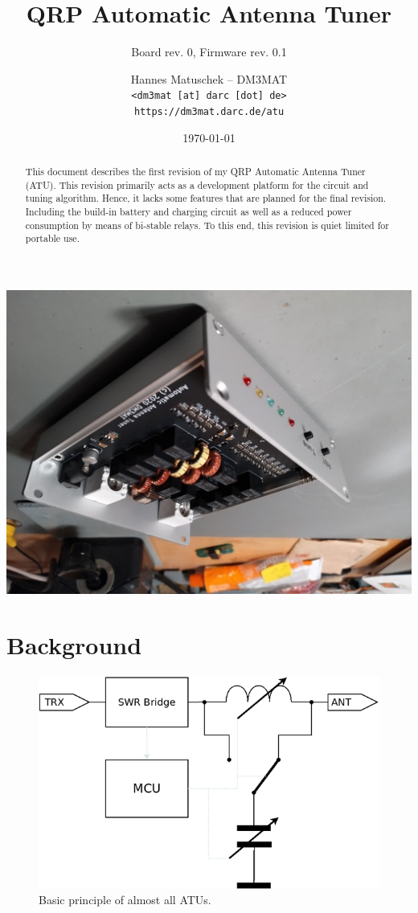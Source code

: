 \documentclass[10pt, a4paper,twoside]{scrartcl}
\title{QRP Automatic Antenna Tuner}
\subtitle{Board rev. 0, Firmware rev. 0.1}
\author{Hannes Matuschek -- DM3MAT\\\texttt{<dm3mat [at] darc [dot] de>}\\\texttt{https://dm3mat.darc.de/atu}}
\date{\today}
\begin{document}
\maketitle

\begin{abstract}
This document describes the first revision of my QRP Automatic Antenna Tuner (ATU). This revision primarily acts as a development platform for the circuit and tuning algorithm. Hence, it lacks some features that are planned for the final revision. Including the build-in battery and charging circuit as well as a reduced power consumption by means of bi-stable relays. To this end, this revision is quiet limited for portable use. 
\end{abstract}
\thispagestyle{empty}
\vfill
\begin{center}
 \includegraphics[width=0.7\linewidth]{fig/atu_rev0_small.png}
\end{center}



\clearpage
\tableofcontents
\thispagestyle{empty}

\clearpage
\section{Background}
\begin{figure}
 \includegraphics[width=\linewidth]{fig/diagram.png}
 \caption{Basic principle of almost all ATUs.} \label{fig:principle}
\end{figure}
\end{document}
